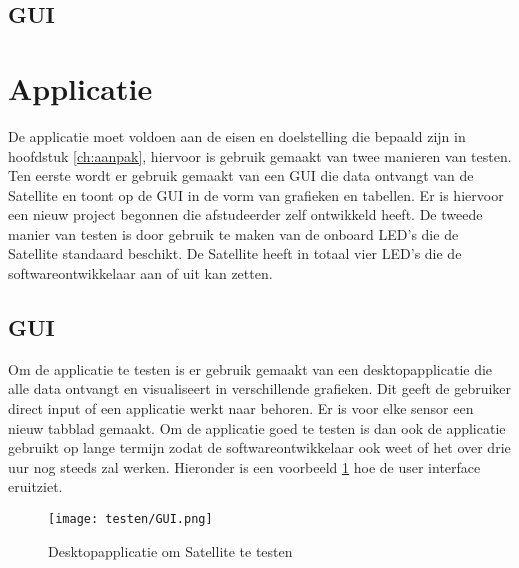 \newpage

\subsection{GUI}
\section{Applicatie}
De applicatie moet voldoen aan de eisen en doelstelling die bepaald zijn in hoofdstuk \ref{ch:aanpak}, hiervoor is gebruik gemaakt van twee manieren van testen. Ten eerste wordt er gebruik gemaakt van een GUI die data ontvangt van de Satellite en toont op de GUI in de vorm van grafieken en tabellen. Er is hiervoor een nieuw project begonnen die afstudeerder zelf ontwikkeld heeft. De tweede manier van testen is door gebruik te maken van de onboard LED's die de Satellite standaard beschikt. De Satellite heeft in totaal vier LED's die de softwareontwikkelaar aan of uit kan zetten. 



\subsection{GUI}
Om de applicatie te testen is er gebruik gemaakt van een desktopapplicatie die alle data ontvangt en visualiseert in verschillende grafieken. Dit geeft de gebruiker direct input of een applicatie werkt naar behoren. Er is voor elke sensor een nieuw tabblad gemaakt. Om de applicatie goed te testen is dan ook de applicatie gebruikt op lange termijn zodat de softwareontwikkelaar ook weet of het over drie uur nog steeds zal werken. Hieronder is een voorbeeld \ref{fig:guitest} hoe de user interface eruitziet. 
\begin{figure}[h!]
	\centering
	\label{fig:guitest}
	\texttt{[image: testen/GUI.png]}
	\caption{Desktopapplicatie om Satellite te testen}
\end{figure}

\newpage

